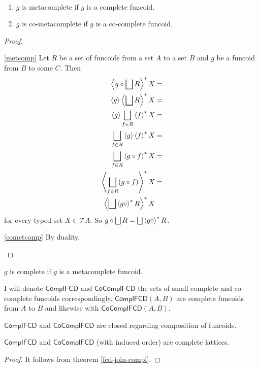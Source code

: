 \begin{thm}\label{metcomp-thm}
~
\begin{enumerate}
\item \label{metcomp}$g$ is metacomplete if $g$ is a complete funcoid.
\item \label{cometcomp}$g$ is co-metacomplete if $g$ is a co-complete
funcoid.
\end{enumerate}
\end{thm}
\begin{proof}
~
\begin{widedisorder}
\item [{\ref{metcomp}}] Let $R$ be a set of funcoids from a set $A$ to a set
$B$ and $g$ be a funcoid from $B$ to some $C$. Then
\begin{align*}
\rsupfun{g\circ\bigsqcup R}X & =\\
\supfun g\rsupfun{\bigsqcup R}X & =\\
\supfun g\bigsqcup_{f\in R}\rsupfun fX & =\\
\bigsqcup_{f\in R}\supfun g\rsupfun fX & =\\
\bigsqcup_{f\in R}\rsupfun{g\circ f}X & =\\
\rsupfun{\bigsqcup_{f\in R}(g\circ f)}X & =\\
\rsupfun{\bigsqcup\rsupfun{g\circ}R}X
\end{align*}
for every typed set $X\in\mathscr{T}A$. So $g\circ\bigsqcup
R=\bigsqcup\rsupfun{g\circ}R$.
\item [{\ref{cometcomp}}] By duality.
\end{widedisorder}
\end{proof}
\begin{conjecture}
$g$ is complete if $g$ is a metacomplete funcoid.
\end{conjecture}
I will denote $\mathsf{ComplFCD}$ and $\mathsf{CoComplFCD}$ the
sets of small complete and co-complete funcoids correspondingly.
$\mathsf{ComplFCD}(A,B)$
are complete funcoids from $A$ to $B$ and likewise with
$\mathsf{CoComplFCD}(A,B)$.
\begin{obvious}
$\mathsf{ComplFCD}$ and $\mathsf{CoComplFCD}$ are closed regarding
composition of funcoids.\end{obvious}
\begin{prop}
$\mathsf{ComplFCD}$ and $\mathsf{CoComplFCD}$ (with induced order)
are complete lattices.\end{prop}
\begin{proof}
It follows from theorem \ref{fcd-join-compl}.\end{proof}
